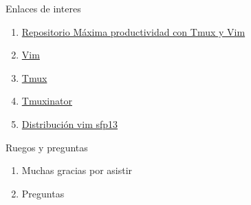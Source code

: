 \documentclass{beamer}
\begin{document}
\begin{frame}{Enlaces de interes}
  \begin{enumerate}
  \item{\href{https://github.com/j-arnaiz/codemotion-2016}{Repositorio Máxima productividad con Tmux y Vim}}
  \item{\href{http://www.vim.org/}{Vim}}
  \item{\href{https://tmux.github.io/}{Tmux}}
  \item{\href{https://github.com/tmuxinator/tmuxinator}{Tmuxinator}}
  \item{\href{http://vim.spf13.com/}{Distribución vim sfp13}}
  \end{enumerate}
\end{frame}

\begin{frame}{Ruegos y preguntas}
  \begin{enumerate}
  \item Muchas gracias por asistir
  \item Preguntas
  \end{enumerate}
\end{frame}
\end{document}
